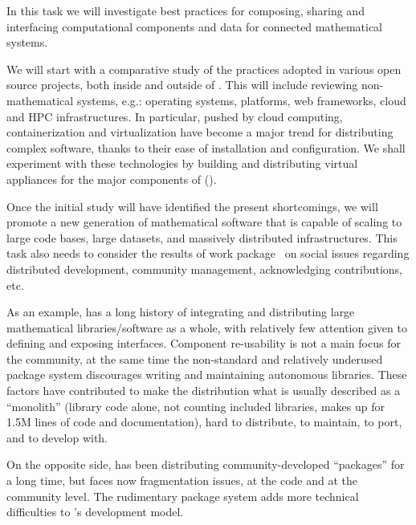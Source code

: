 \begin{workpackage}[id=component-architecture,wphases=0-48!.5,
  title=Component Architecture,lead=UV,
  PSRM=64,UVRM=8,SARM=16, USHRM=4, USORM=6, UORM=4, LLRM=22]
\begin{tasklist}
\begin{task}[title=Modularization and packaging,id=mod-packaging,lead=UV,PM=32,partners={PS,LL},wphases=0-48]

    In this task we will investigate best practices for composing,
    sharing and interfacing computational components and data for
    connected mathematical systems.

    We will start with a comparative study of the practices adopted in
    various open source projects, both inside and outside of
    \TheProject. This will include reviewing non-mathematical systems,
    e.g.: operating systems, platforms, web frameworks, cloud and HPC
    infrastructures.  In particular, pushed by cloud computing,
    containerization and virtualization have become a major trend for
    distributing complex software, thanks to their ease of
    installation and configuration. We shall experiment with these
    technologies by building and distributing virtual appliances for
    the major components of \TheProject
    ().

    Once the initial study will have identified the present
    shortcomings, we will promote a new generation of mathematical
    software that is capable of scaling to large code bases, large
    datasets, and massively distributed infrastructures. This task
    also needs to consider the results of work
    package~ on social issues regarding
    distributed development, community management, acknowledging
    contributions, etc.

    As an example, \Sage has a long history of integrating and
    distributing large mathematical libraries/software as a whole,
    with relatively few attention given to defining and exposing
    interfaces. Component re-usability is not a main focus for the
    \Sage community, at the same time the non-standard and relatively
    underused package system discourages writing and maintaining
    autonomous libraries. These factors have contributed to make the
    \Sage distribution what is usually described as a ``monolith''
    (\Sage library code alone, not counting included libraries, makes
    up for 1.5M lines of code and documentation), hard to distribute,
    to maintain, to port, and to develop with.

    On the opposite side, \GAP has been distributing
    community-developed ``\GAP packages'' for a long time, but faces
    now fragmentation issues, at the code and at the community
    level. The rudimentary package system adds more technical
    difficulties to \GAP's development model.


\end{task}
\end{tasklist}
\end{workpackage}
